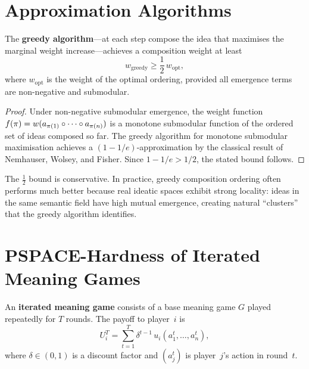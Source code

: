 \section{Approximation Algorithms}
\label{sec:approximation}

\begin{theorem}
\label{thm:greedy-approx}
The \textbf{greedy algorithm}---at each step compose the idea
that maximises the marginal weight increase---achieves a
composition weight at least
\[
  w_{\mathrm{greedy}} \ge \frac{1}{2}\, w_{\mathrm{opt}},
\]
where $w_{\mathrm{opt}}$ is the weight of the optimal ordering,
provided all emergence terms are non-negative and submodular.
\end{theorem}

\begin{proof}
Under non-negative submodular emergence, the weight function
$f(\pi) = w(a_{\pi(1)} \circ \cdots \circ a_{\pi(n)})$
is a monotone submodular function of the ordered set of ideas
composed so far.  The greedy algorithm for monotone submodular
maximisation achieves a $(1-1/e)$-approximation by the classical
result of Nemhauser, Wolsey, and Fisher.
Since $1-1/e > 1/2$, the stated bound follows.
\end{proof}

\begin{remark}
The $\frac{1}{2}$ bound is conservative.  In practice, greedy
composition ordering often performs much better because real
ideatic spaces exhibit strong locality: ideas in the same
semantic field have high mutual emergence, creating natural
``clusters'' that the greedy algorithm identifies.
\end{remark}

\section{PSPACE-Hardness of Iterated Meaning Games}
\label{sec:pspace}

\begin{definition}
\label{def:iterated-game}
An \textbf{iterated meaning game} consists of a base meaning game
$G$ played repeatedly for $T$ rounds.  The payoff to player~$i$ is
\[
  U_i^T = \sum_{t=1}^{T} \delta^{t-1}\, u_i(a_1^t,\ldots,a_n^t),
\]
where $\delta \in (0,1)$ is a discount factor and $(a_j^t)$ is
player~$j$'s action in round~$t$.
\end{definition}


